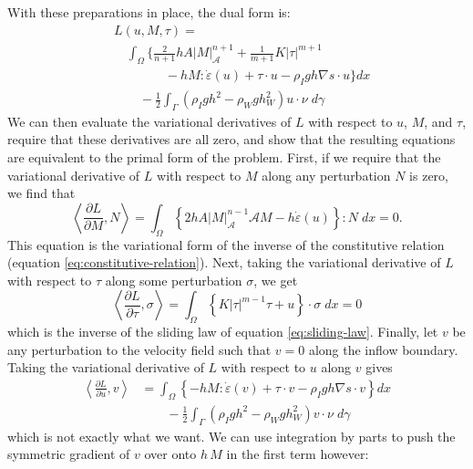 \documentclass[review,oneside]{igs}
\begin{document}
With these preparations in place, the dual form is:
\begin{align}
    & L(u, M, \tau) = \nonumber\\
    & \quad \int_\Omega\Bigg\{\frac{2}{n + 1}hA|M|_{\mathscr A}^{n + 1} + \frac{1}{m + 1}K|\tau|^{m + 1} \nonumber\\
    & \qquad\qquad - hM:\dot\varepsilon(u) + \tau\cdot u - \rho_Igh\nabla s\cdot u\Bigg\}dx \nonumber \\
    & \qquad - \frac{1}{2}\int_\Gamma\left(\rho_Igh^2 - \rho_Wgh_W^2\right)u\cdot\nu\;d\gamma
    \label{eq:ssa-dual-form}
\end{align}
We can then evaluate the variational derivatives of $L$ with respect to $u$, $M$, and $\tau$, require that these derivatives are all zero, and show that the resulting equations are equivalent to the primal form of the problem.
First, if we require that the variational derivative of $L$ with respect to $M$ along any perturbation $N$ is zero, we find that
\begin{equation}
    \left\langle\frac{\partial L}{\partial M}, N\right\rangle = \int_\Omega\left\{2hA|M|_{\mathscr{A}}^{n - 1}\mathscr{A}M - h\dot\varepsilon(u)\right\} : N\; dx = 0.
\end{equation}
This equation is the variational form of the inverse of the constitutive relation (equation \eqref{eq:constitutive-relation}).
Next, taking the variational derivative of $L$ with respect to $\tau$ along some perturbation $\sigma$, we get
\begin{equation}
    \left\langle\frac{\partial L}{\partial\tau}, \sigma\right\rangle = \int_\Omega\left\{K|\tau|^{m - 1}\tau + u\right\}\cdot\sigma\;dx = 0
\end{equation}
which is the inverse of the sliding law of equation \eqref{eq:sliding-law}.
Finally, let $v$ be any perturbation to the velocity field such that $v = 0$ along the inflow boundary.
Taking the variational derivative of $L$ with respect to $u$ along $v$ gives
\begin{align}
    \left\langle\frac{\partial L}{\partial u}, v\right\rangle & = \int_\Omega\left\{-hM : \dot\varepsilon(v) + \tau\cdot v - \rho_Igh\nabla s\cdot v\right\}dx \nonumber\\
    & \qquad -\frac{1}{2}\int_{\Gamma}\left(\rho_Igh^2 - \rho_Wgh_W^2\right)v\cdot\nu\;d\gamma
\end{align}
which is not exactly what we want.
We can use integration by parts to push the symmetric gradient of $v$ over onto $h\,M$ in the first term however:
\end{document}
